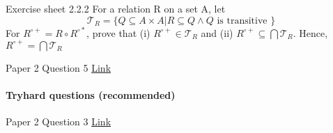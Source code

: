 \documentclass{exam}
\begin{document}
\begin{questions}
\question Exercise sheet 2.2.2 For a relation R on a set A, let 
$$\mathcal{T}_R = \{Q \subseteq A \times A | R \subseteq Q \wedge Q \text{ is transitive }\}$$ 	
For $R^{\circ+} = R \circ R^{\circ*}$, prove that (i) $R^{\circ+} \in \mathcal{T}_R$ and (ii) $R^{\circ+} \subseteq \bigcap \mathcal{T}_R$. Hence, $R^{\circ+} = \bigcap \mathcal{T}_R$

 Paper 2 Question 5 \href{http://www.cl.cam.ac.uk/teaching/exams/pastpapers/y2007p2q5.pdf}{Link} 

\end{questions}

\paragraph{Tryhard questions (recommended)}
\begin{questions}

 Paper 2 Question 3 \href{http://www.cl.cam.ac.uk/teaching/exams/pastpapers/y2008p2q3.pdf}{Link} 

\end{questions}
\end{document}

